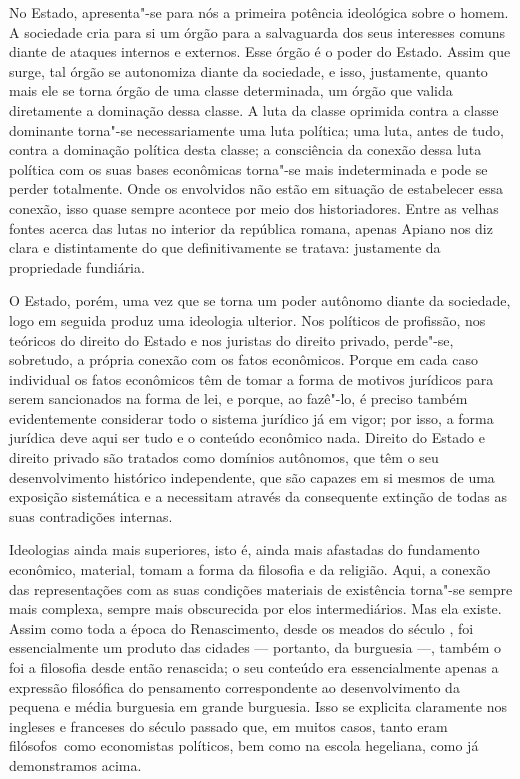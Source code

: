 No Estado, apresenta"-se para nós a primeira potência 
ideológica sobre o homem. A sociedade cria para si um órgão para a
salvaguarda dos seus interesses comuns diante de ataques internos e
externos. Esse órgão é o poder do Estado. Assim que  
surge, tal órgão se autonomiza diante da sociedade, e isso, justamente,
quanto mais ele se torna órgão de uma classe determinada, um órgão que
valida diretamente a dominação dessa classe. A luta da classe oprimida
contra a classe dominante torna"-se necessariamente uma luta política;
uma luta, antes de tudo, contra a dominação política desta classe; a
consciência da conexão dessa luta política com os suas bases
econômicas torna"-se mais indeterminada  
e pode se perder totalmente. Onde os envolvidos não estão em situação de estabelecer essa conexão, isso quase sempre acontece por meio dos historiadores. Entre as velhas fontes acerca das
lutas no interior da república romana, apenas Apiano nos diz clara e distintamente do que definitivamente se tratava: justamente da
propriedade fundiária.

O Estado, porém, uma vez que se torna um poder autônomo  
diante da sociedade, logo em seguida produz uma ideologia ulterior. Nos
políticos de profissão, nos teóricos do direito do Estado e nos juristas
do direito privado, perde"-se, sobretudo, a própria conexão com os
fatos econômicos. Porque em cada caso individual os fatos econômicos têm
de tomar a forma de motivos jurídicos para serem sancionados na forma de
lei, e porque, ao fazê"-lo, é preciso também evidentemente considerar
todo o sistema jurídico já em vigor; por isso, a forma jurídica deve
aqui ser tudo e o conteúdo econômico nada. Direito do Estado e direito
privado são tratados como domínios autônomos, que têm o seu
desenvolvimento histórico independente, que são capazes em si mesmos de
uma exposição sistemática e a necessitam através da consequente extinção
de todas as suas contradições internas.

Ideologias ainda mais superiores, isto é, ainda mais afastadas do
fundamento econômico, material, tomam a forma da filosofia e da
religião. Aqui, a conexão das representações com as suas condições
materiais de existência torna"-se sempre mais complexa, sempre mais
obscurecida por elos intermediários. Mas ela existe. Assim como toda a
época do Renascimento, desde os meados do século , foi essencialmente
um produto das cidades --- portanto, da burguesia ---, também o foi a filosofia
desde então renascida; o seu conteúdo era essencialmente apenas a
expressão filosófica do pensamento correspondente ao desenvolvimento da
pequena e média burguesia em grande burguesia. Isso se explicita
claramente nos ingleses e franceses do século passado que, em muitos
casos, tanto eram filósofos\est\ como economistas políticos, bem como na escola
hegeliana, como já demonstramos acima.

